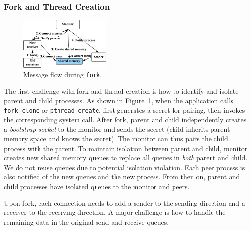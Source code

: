 \subsubsection{Fork and Thread Creation}
\label{subsubsec:fork_fork}


\begin{figure}[t]
	\centering
	\includegraphics[width=0.4\textwidth]{images/fork}
	\caption{Message flow during \texttt{fork}.}
	\label{fig:fork-fork}
\end{figure}


The first challenge with fork and thread creation is how to identify and isolate parent and child processes. As shown in Figure~\ref{fig:fork-fork}, when the application calls \texttt{fork}, \texttt{clone} or \texttt{pthread\_create}, \libipc{} first generates a secret for pairing, then invokes the corresponding system call. After fork, parent and child independently creates a \textit{bootstrap socket} to the monitor and sends the secret (child inherits parent memory space and knows the secret). The monitor can thus pairs the child process with the parent. 
To maintain isolation between parent and child, monitor creates new shared memory queues to replace all queues in \emph{both} parent and child. We do not reuse queues due to potential isolation violation. %
Each peer process is also notified of the new queues and the new process. From then on, parent and child processes have isolated queues to the monitor and peers.

Upon fork, each connection needs to add a sender to the sending direction and a receiver to the receiving direction. A major challenge is how to handle the remaining data in the original send and receive queues.



